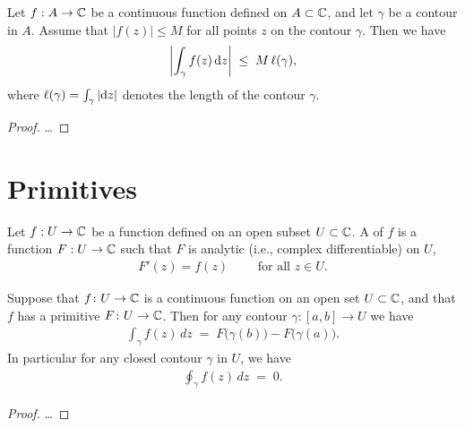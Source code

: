 \begin{corollary}
  \label{lem:contour_integral_bound}
  Let $f : A \to \mathbb{C}$ be a continuous function defined on $A \subset \mathbb{C}$,
  and let $\gamma$ be a contour in $A$.
  Assume that $|f(z)| \le M$ for all points $z$ on the contour $\gamma$.
  Then we have
  \begin{align*}
    \left| \int_\gamma f(z) \, \mathrm{d} z \right| \; \le \; M \, \ell(\gamma) ,
  \end{align*}
  where $\ell(\gamma) = \int_\gamma |\mathrm{d} z|$ denotes the length of
  the contour $\gamma$.
\end{corollary}
\begin{proof}
  \ldots
\end{proof}



\section{Primitives}

\begin{definition}
  \label{def:primitive}
  Let $f : U \to \mathbb{C}$ be a function defined on an open subset $U \subset \mathbb{C}$.
  A  of $f$ is a function $F : U \to \mathbb{C}$ such that
  $F$ is analytic (i.e., complex differentiable) on $U$,
  \begin{align*}
    F'(z) = f(z) \qquad \text{ for all } z \in U .
  \end{align*}
\end{definition}

\begin{theorem}
  \label{thm:ftc_for_contour_integrals}
  Suppose that $f \colon U \to \mathbb{C}$ is a continuous function
  on an open set $U \subset \mathbb{C}$, and that $f$ has a
  primitive $F \colon U \to \mathbb{C}$.
  Then for any contour $\gamma \colon [a,b] \to U$ we have
  \begin{align*}
    \int_\gamma f(z) \, dz \; = \; F \big( \gamma(b) \big) - F \big( \gamma(a) \big) .
  \end{align*}
  In particular for any closed contour $\gamma$ in $U$, we have
  \begin{align*}
    \oint_\gamma f(z) \, dz \; = \; 0 .
  \end{align*}
\end{theorem}
\begin{proof}
  \ldots
\end{proof}

